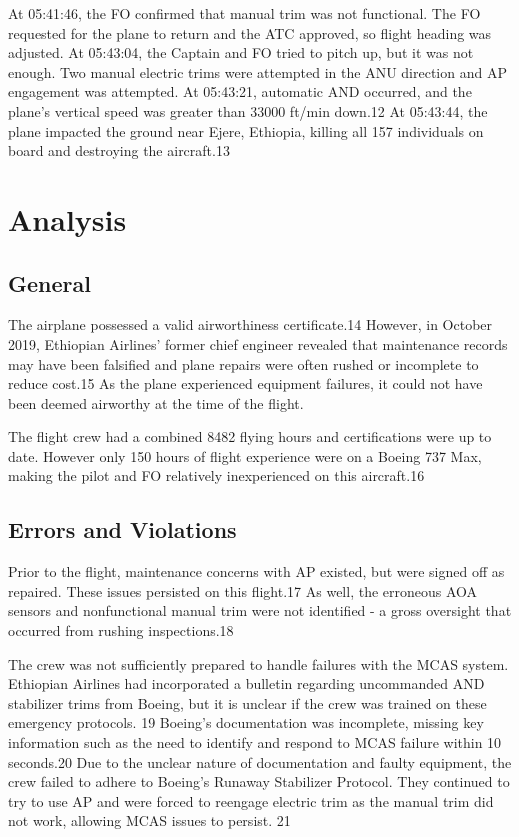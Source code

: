 \documentclass[
  10pt,
  promotesection,
  endnotes,
  draft,
]{memreport}
\begin{document}
  At 05:41:46, the FO confirmed that manual trim was not functional. The FO requested for the plane to return and the ATC approved, so flight heading was adjusted. At 05:43:04, the Captain and FO tried to pitch up, but it was not enough. Two manual electric trims were attempted in the ANU direction and AP engagement was attempted. At 05:43:21, automatic AND occurred, and the plane's vertical speed was greater than 33000 ft/min down.12 At 05:43:44, the plane impacted the ground near Ejere, Ethiopia, killing all 157 individuals on board and destroying the aircraft.13
  \section{Analysis}
  \subsection{General}
  The airplane possessed a valid airworthiness certificate.14 However, in October 2019, Ethiopian Airlines' former chief engineer revealed that maintenance records may have been falsified and plane repairs were often rushed or incomplete to reduce cost.15 As the plane experienced equipment failures, it could not have been deemed airworthy at the time of the flight.

  The flight crew had a combined 8482 flying hours and certifications were up to date. However only 150 hours of flight experience were on a Boeing 737 Max, making the pilot and FO relatively inexperienced on this aircraft.16
  \subsection{Errors and Violations}
  Prior to the flight, maintenance concerns with AP existed, but were signed off as repaired. These issues persisted on this flight.17 As well, the erroneous AOA sensors and nonfunctional manual trim were not identified - a gross oversight that occurred from rushing inspections.18

  The crew was not sufficiently prepared to handle failures with the MCAS system. Ethiopian Airlines had incorporated a bulletin regarding uncommanded AND stabilizer trims from Boeing, but it is unclear if the crew was trained on these emergency protocols. 19 Boeing's documentation was incomplete, missing key information such as the need to identify and respond to MCAS failure within 10 seconds.20 Due to the unclear nature of documentation and faulty equipment, the crew failed to adhere to Boeing's Runaway Stabilizer Protocol. They continued to try to use AP and were forced to reengage electric trim as the manual trim did not work, allowing MCAS issues to persist. 21
\end{document}

